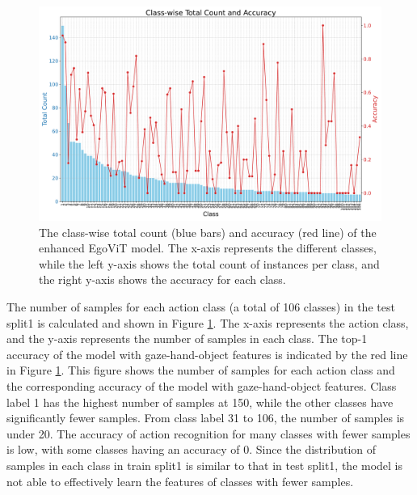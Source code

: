 \begin{figure}[htbp]
    \centering
    \includegraphics[width=\textwidth]{graphics/2in1}
    \caption{The class-wise total count (blue bars) and accuracy (red line) of the enhanced EgoViT model. The x-axis represents the different classes, while the left y-axis shows the total count of instances per class, and the right y-axis shows the accuracy for each class. }
    \label{fig:action_class}
\end{figure}
\vspace{3mm}
The number of samples for each action class (a total of 106 classes) in the test split1 is calculated and shown in Figure \ref{fig:action_class}. The x-axis represents the action class, and the y-axis represents the number of samples in each class. The top-1 accuracy of the model with gaze-hand-object features is indicated by the red line in Figure \ref{fig:action_class}. This figure shows the number of samples for each action class and the corresponding accuracy of the model with gaze-hand-object features. Class label 1 has the highest number of samples at 150, while the other classes have significantly fewer samples. From class label 31 to 106, the number of samples is under 20. The accuracy of action recognition for many classes with fewer samples is low, with some classes having an accuracy of 0. Since the distribution of samples in each class in train split1 is similar to that in test split1, the model is not able to effectively learn the features of classes with fewer samples.

